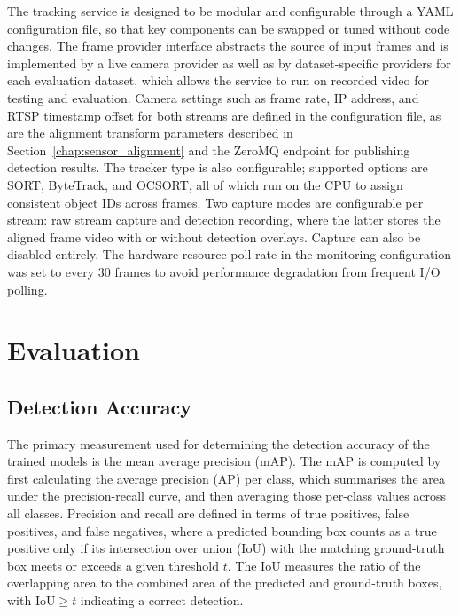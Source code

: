 \documentclass[12pt,oneside,bibtotoc,liststotoc]{scrbook}
\begin{document}
The tracking service is designed to be modular and configurable through a YAML
configuration file, so that key components can be swapped or tuned without
code changes.
The frame provider interface abstracts the source of input frames and is
implemented by a live camera provider as well as by dataset-specific providers
for each evaluation dataset, which allows the service to run on recorded video
for testing and evaluation.
Camera settings such as frame rate, IP address, and RTSP timestamp offset for
both streams are defined in the configuration file, as are the alignment
transform parameters described in Section~\ref{chap:sensor_alignment} and the
ZeroMQ endpoint for publishing detection results.
The tracker type is also configurable; supported options are SORT, ByteTrack,
and OCSORT, all of which run on the CPU to assign consistent object IDs across
frames.
Two capture modes are configurable per stream: raw stream capture and
detection recording, where the latter stores the aligned frame video with or
without detection overlays.
Capture can also be disabled entirely.
The hardware resource poll rate in the monitoring configuration was set to
every 30 frames to avoid performance degradation from frequent I/O polling.

\newpage
\chapter{Evaluation}
\label{chap:evaluation}

\vspace{-1em}
\section{Detection Accuracy}
\vspace{-0.5em}

The primary measurement used for determining the detection accuracy of the trained
models is the mean average precision (mAP). The mAP is computed by first calculating
the average precision (AP) per class, which summarises the area under the
precision-recall curve, and then averaging those per-class values across all classes.
Precision and recall are defined in terms of true positives,
false positives, and false negatives, where a predicted bounding box counts as a true
positive only if its intersection over union (IoU) with the matching ground-truth box
meets or exceeds a given threshold $t$. The IoU measures the ratio of the overlapping
area to the combined area of the predicted and ground-truth boxes, with
$\text{IoU} \geq t$ indicating a correct detection.
\cite{padilla2020surveyPerformanceMetricsObjectDetection}
\end{document}
